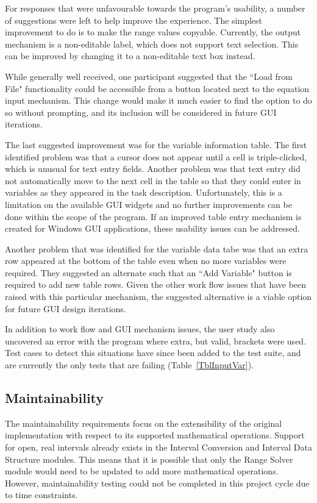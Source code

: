\documentclass[12pt, titlepage]{article}
\begin{document}
For responses that were unfavourable towards the program's usability, a number 
of suggestions were left to help improve the experience. The simplest 
improvement to do is to make the range values copyable. Currently, the output 
mechanism is a non-editable label, which does not support text selection. This 
can be improved by changing it to a non-editable text box instead.

While generally well received, one participant suggested that the ``Load from 
File" functionality could be accessible from a button located next to the 
equation input mechanism. This change would make it much easier to find the 
option to do so without prompting, and its inclusion will be considered in 
future GUI iterations.

The last suggested improvement was for the variable information table. The 
first identified problem was that a cursor does not appear until a cell is 
triple-clicked, which is unusual for text entry fields. Another problem was 
that text entry did not automatically move to the next cell in the table so 
that they could enter in variables as they appeared in the task description. 
Unfortunately, this is a limitation on the available GUI widgets and no further 
improvements can be done within the scope of the program. If an improved table 
entry mechanism is created for Windows GUI applications, these usability issues 
can be addressed.

Another problem that was identified for the variable data tabe was that an 
extra row appeared at the bottom of the table even when no more variables were 
required. They suggested an alternate such that an ``Add Variable" button is 
required to add new table rows. Given the other work flow issues that have been 
raised with this particular mechanism, the suggested alternative is a viable 
option for future GUI design iterations.

In addition to work flow and GUI mechanism issues, the user study also 
uncovered an error with the program where extra, but valid, brackets were used. 
Test cases to detect this situations have since been added to the test suite, 
and are currently the only tests that are failing (Table~\ref{TblInputVar}).
		
\subsection{Maintainability}
The maintainability requirements focus on the extensibility of the original 
implementation with respect to its supported mathematical operations. Support 
for open, real intervals already exists in the Interval Conversion and Interval 
Data Structure modules. This means that it is possible that only the Range 
Solver module would need to be updated to add more mathematical operations. 
However, maintainability testing could not be completed in this project cycle 
due to time constraints.
\end{document}
